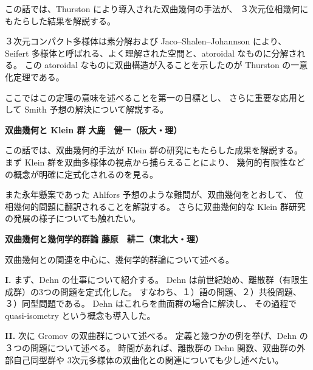 \documentclass[uplatex,dvipdfmx]{jlreq}
\begin{document}
\bigskip

この話では、Thurston により導入された双曲幾何の手法が、
３次元位相幾何にもたらした結果を解説する。

３次元コンパクト多様体は素分解および Jaco--Shalen--Johannson により、
Seifert 多様体と呼ばれる、よく理解された空間と、atoroidal なものに分解される。
この atoroidal なものに双曲構造が入ることを示したのが Thurston の一意化定理である。

ここではこの定理の意味を述べることを第一の目標とし、
さらに重要な応用として Smith 予想の解決について解説する。

\newpage

\noindent
{\large\bfseries 双曲幾何と Klein 群}
\hfill
{\large\bfseries 大鹿　健一（阪大・理）}

\bigskip

この話では、双曲幾何的手法が Klein 群の研究にもたらした成果を解説する。
まず Klein 群を双曲多様体の視点から捕らえることにより、
幾何的有限性などの概念が明確に定式化されるのを見る。

また永年懸案であった Ahlfors 予想のような難問が、双曲幾何をとおして、
位相幾何的問題に翻訳されることを解説する。
さらに双曲幾何的な Klein 群研究の発展の様子についても触れたい。

\newpage

\noindent
{\large\bfseries 双曲幾何と幾何学的群論}
\hfill
{\large\bfseries 藤原　耕二（東北大・理）}

\bigskip

双曲幾何との関連を中心に、幾何学的群論について述べる。

\medskip
\noindent\textbf{I.}\quad
まず、Dehn の仕事について紹介する。
Dehn は前世紀始め、離散群（有限生成群）の3つの問題を定式化した。
すなわち、１）語の問題、２）共役問題、３）同型問題である。
Dehn はこれらを曲面群の場合に解決し、
その過程で quasi-isometry という概念も導入した。

\medskip
\noindent\textbf{II.}\quad
次に Gromov の双曲群について述べる。
定義と幾つかの例を挙げ、Dehn の３つの問題について述べる。
時間があれば、離散群の Dehn 関数、双曲群の外部自己同型群や
3次元多様体の双曲化との関連についても少し述べたい。
\end{document}
